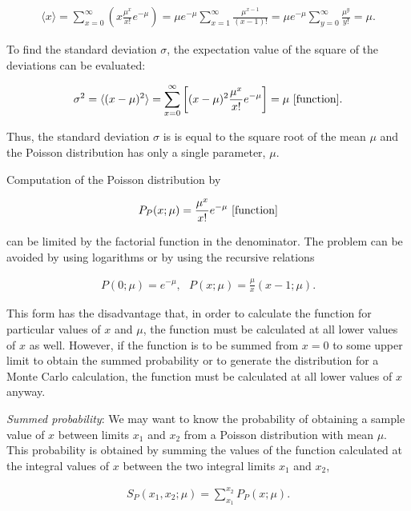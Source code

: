\documentclass[a4paper,10pt]{article}
\begin{document}
\begin{align*}
    \langle x\rangle = \sum_{x=0}^\infty \left(x\frac{\mu^x}{x!}e^{-\mu}\right) = \mu e^{-\mu} \sum_{x=1}^\infty \frac{\mu^{x-1}}{(x-1)!} = \mu e^{-\mu} \sum_{y=0}^\infty \frac{\mu^y}{y!} = \mu.
\end{align*}

{\noindent}To find the standard deviation $\sigma$, the expectation value of the square of the deviations can be evaluated:

\begin{align*}
    \sigma^2 = \langle (x-\mu)^2 \rangle = \sum_{x=0}^\infty \left[ (x-\mu)^2\frac{\mu^x}{x!}e^{-\mu} \right] = \mu ~ [{\rm function}].
\end{align*}

{\noindent}Thus, the standard deviation $\sigma$ is is equal to the square root of the mean $\mu$ and the Poisson distribution has only a single parameter, $\mu$.

{\noindent}Computation of the Poisson distribution by

\begin{align*}
    P_P(x;\mu) = \frac{\mu^x}{x!} e^{-\mu} ~ [{\rm function}]
\end{align*}

{\noindent}can be limited by the factorial function in the denominator. The problem can be avoided by using logarithms or by using the recursive relations

\begin{align*}
    P(0;\mu)=e^{-\mu}, ~~~ P(x;\mu)=\frac{\mu}{x}(x-1;\mu).
\end{align*}

{\noindent}This form has the disadvantage that, in order to calculate the function for particular values of $x$ and $\mu$, the function must be calculated at all lower values of $x$ as well. However, if the function is to be summed from $x=0$ to some upper limit to obtain the summed probability or to generate the distribution for a Monte Carlo calculation, the function must be calculated at all lower values of $x$ anyway.

{\noindent}\textit{Summed probability}: We may want to know the probability of obtaining a sample value of $x$ between limits $x_1$ and $x_2$ from a Poisson distribution with mean $\mu$. This probability is obtained by summing the values of the function calculated at the integral values of $x$ between the two integral limits $x_1$ and $x_2$,

\begin{align*}
    S_P(x_1,x_2;\mu) = \sum_{x_1}^{x_2} P_P(x;\mu).
\end{align*}
\end{document}
